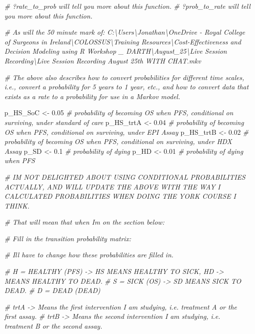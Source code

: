 \documentclass[
]{article}
\newenvironment{Shaded}{\begin{snugshade}}{\end{snugshade}}
\newcommand{\CommentTok}[1]{\textcolor[rgb]{0.56,0.35,0.01}{\textit{#1}}}
\newcommand{\FloatTok}[1]{\textcolor[rgb]{0.00,0.00,0.81}{#1}}
\newcommand{\NormalTok}[1]{#1}
\newcommand{\OtherTok}[1]{\textcolor[rgb]{0.56,0.35,0.01}{#1}}
\begin{document}
\begin{Shaded}
\begin{Highlighting}[]
\CommentTok{\# ?rate\_to\_prob will tell you more about this function.}
\CommentTok{\# ?prob\_to\_rate will tell you more about this function.}

\CommentTok{\# As will the 50 minute mark of: C:\textbackslash{}Users\textbackslash{}Jonathan\textbackslash{}OneDrive {-} Royal College of Surgeons in Ireland\textbackslash{}COLOSSUS\textbackslash{}Training Resources\textbackslash{}Cost{-}Effectiveness and Decision Modeling using R Workshop \_ DARTH\textbackslash{}August\_25\textbackslash{}Live Session Recording\textbackslash{}Live Session Recording August 25th WITH CHAT.mkv}


\CommentTok{\# The above also describes how to convert probabilities for different time scales, i.e., convert a probability for 5 years to 1 year, etc., and how to convert data that exists as a rate to a probability for use in a Markov model.}


\NormalTok{p\_HS\_SoC  }\OtherTok{\textless{}{-}} \FloatTok{0.05}  \CommentTok{\# probability of becoming OS when PFS, conditional on surviving, under standard of care}
\NormalTok{p\_HS\_trtA }\OtherTok{\textless{}{-}} \FloatTok{0.04}  \CommentTok{\# probability of becoming OS when PFS, conditional on surviving, under EPI Assay}
\NormalTok{p\_HS\_trtB }\OtherTok{\textless{}{-}} \FloatTok{0.02}  \CommentTok{\# probability of becoming OS when PFS, conditional on surviving, under HDX Assay}
\NormalTok{p\_SD      }\OtherTok{\textless{}{-}} \FloatTok{0.1}   \CommentTok{\# probability of dying          }
\NormalTok{p\_HD      }\OtherTok{\textless{}{-}} \FloatTok{0.01}  \CommentTok{\# probability of dying when PFS}

\CommentTok{\# I\textquotesingle{}M NOT DELIGHTED ABOUT USING CONDITIONAL PROBABILITIES ACTUALLY, AND WILL UPDATE THE ABOVE WITH THE WAY I CALCULATED PROBABILITIES WHEN DOING THE YORK COURSE I THINK.}

\CommentTok{\# That will mean that when I\textquotesingle{}m on the section below:}

\CommentTok{\# Fill in the transition probability matrix:}

\CommentTok{\# I\textquotesingle{}ll have to change how these probabilities are filled in.}


\CommentTok{\# H = HEALTHY (PFS) {-}\textgreater{} HS MEANS HEALTHY TO SICK, HD {-}\textgreater{} MEANS HEALTHY TO DEAD.}
\CommentTok{\# S = SICK (OS) {-}\textgreater{} SD MEANS SICK TO DEAD.}
\CommentTok{\# D = DEAD (DEAD) }

\CommentTok{\# trtA {-}\textgreater{} Means the first intervention I am studying, i.e. treatment A or the first assay.}
\CommentTok{\# trtB {-}\textgreater{} Means the second intervention I am studying, i.e. treatment B or the second assay.}


\end{Highlighting}
\end{Shaded}
\end{document}
